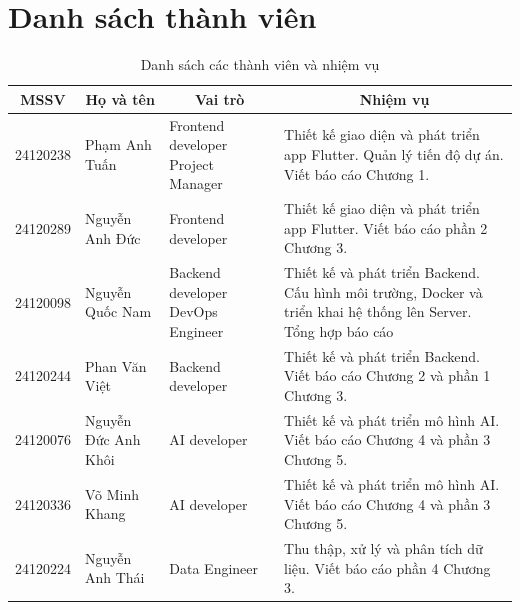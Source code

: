 \section*{Danh sách thành viên}

\begin{table}[H]
\centering
\renewcommand{\arraystretch}{1.3}
\begin{tabular}{|c|m{4.5cm}|m{4cm}|m{6cm}|}
\hline
\textbf{MSSV} & \multicolumn{1}{c|}{\textbf{Họ và tên}} & \multicolumn{1}{c|}{\textbf{Vai trò}} & \multicolumn{1}{c|}{\textbf{Nhiệm vụ}} \\ \hline
24120238 & Phạm Anh Tuấn & Frontend developer \newline Project Manager & Thiết kế giao diện và phát triển app Flutter. \newline Quản lý tiến độ dự án. \newline Viết báo cáo Chương 1. \\ \hline
24120289 & Nguyễn Anh Đức & Frontend developer & Thiết kế giao diện và phát triển app Flutter. \newline Viết báo cáo phần 2 Chương 3. \\ \hline
24120098 & Nguyễn Quốc Nam & Backend developer \newline DevOps Engineer & Thiết kế và phát triển Backend. \newline Cấu hình môi trường, Docker và triển khai hệ thống lên Server. \newline Tổng hợp báo cáo\\ \hline
24120244 & Phan Văn Việt & Backend developer & Thiết kế và phát triển Backend. \newline Viết báo cáo Chương 2 và phần 1 Chương 3. \\ \hline
24120076 & Nguyễn Đức Anh Khôi & AI developer & Thiết kế và phát triển mô hình AI. \newline Viết báo cáo Chương 4 và phần 3 Chương 5. \\ \hline
24120336 & Võ Minh Khang & AI developer & Thiết kế và phát triển mô hình AI. \newline Viết báo cáo Chương 4 và phần 3 Chương 5. \\ \hline
24120224 & Nguyễn Anh Thái & Data Engineer & Thu thập, xử lý và phân tích dữ liệu. \newline Viết báo cáo phần 4 Chương 3. \\ \hline
\end{tabular}
\caption{Danh sách các thành viên và nhiệm vụ}
\label{tab:member_list}
\end{table}

